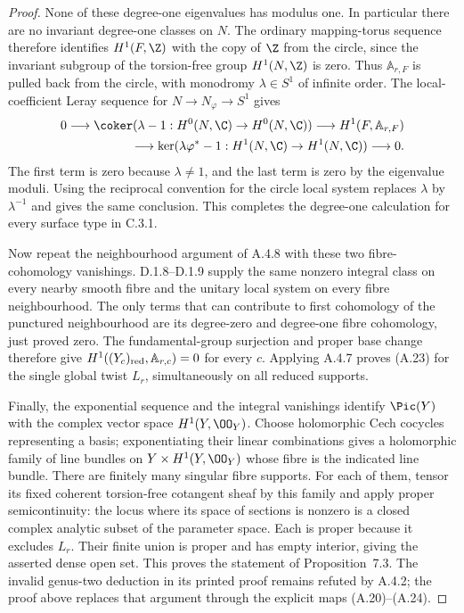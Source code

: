 \begin{proof}
None of these degree-one eigenvalues has modulus one. In particular there are no invariant degree-one classes on $N$. The ordinary mapping-torus sequence therefore identifies $H^1(F,\Z)$ with the copy of $\Z$ from the circle, since the invariant subgroup of the torsion-free group $H^1(N,\Z)$ is zero. Thus $\mathbb A_{r,F}$ is pulled back from the circle, with monodromy $\lambda\in S^1$ of infinite order. The local-coefficient Leray sequence for $N\to N_\varphi\to S^1$ gives
\[
\begin{split}
0\longrightarrow
 \coker(\lambda-1:H^0(N,\C)\to H^0(N,\C))
 \longrightarrow H^1(F,\mathbb A_{r,F})\\
 \longrightarrow
 \ker(\lambda\varphi^*-1:H^1(N,\C)\to H^1(N,\C))
 \longrightarrow0.
\end{split}
\]
The first term is zero because $\lambda\ne1$, and the last term is zero by the eigenvalue moduli. Using the reciprocal convention for the circle local system replaces $\lambda$ by $\lambda^{-1}$ and gives the same conclusion. This completes the degree-one calculation for every surface type in C.3.1.

Now repeat the neighbourhood argument of A.4.8 with these two fibre-cohomology vanishings. D.1.8--D.1.9 supply the same nonzero integral class on every nearby smooth fibre and the unitary local system on every fibre neighbourhood. The only terms that can contribute to first cohomology of the punctured neighbourhood are its degree-zero and degree-one fibre cohomology, just proved zero. The fundamental-group surjection and proper base change therefore give $H^1((Y_c)_{\rm red},\mathbb A_{r,c})=0$ for every $c$. Applying A.4.7 proves (A.23) for the single global twist $L_r$, simultaneously on all reduced supports.

Finally, the exponential sequence and the integral vanishings identify $\Pic(Y)$ with the complex vector space $H^1(Y,\OO_Y)$. Choose holomorphic Cech cocycles representing a basis; exponentiating their linear combinations gives a holomorphic family of line bundles on $Y\times H^1(Y,\OO_Y)$ whose fibre is the indicated line bundle. There are finitely many singular fibre supports. For each of them, tensor its fixed coherent torsion-free cotangent sheaf by this family and apply proper semicontinuity: the locus where its space of sections is nonzero is a closed complex analytic subset of the parameter space. Each is proper because it excludes $L_r$. Their finite union is proper and has empty interior, giving the asserted dense open set. This proves the statement of Proposition~7.3. The invalid genus-two deduction in its printed proof remains refuted by A.4.2; the proof above replaces that argument through the explicit maps (A.20)--(A.24).
\end{proof}
